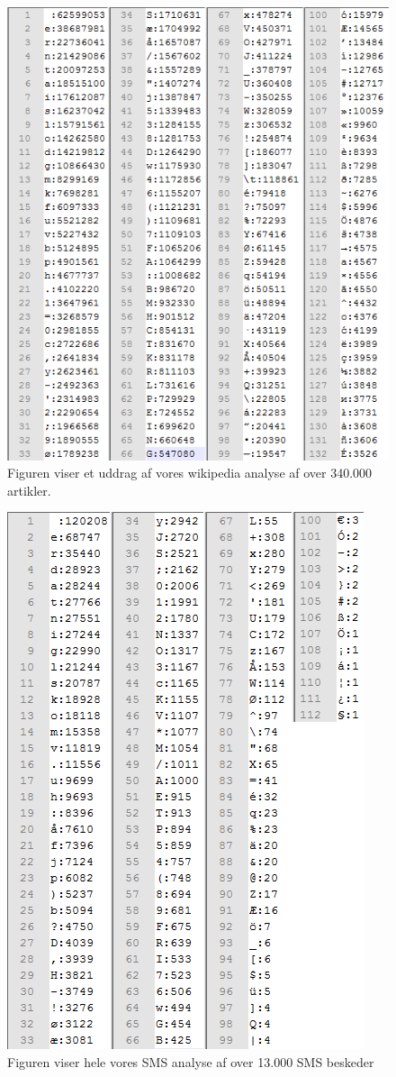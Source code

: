 \begin{figure}[H]
\includegraphics []{Billeder/wikiBilag.png}
\caption {Figuren viser et uddrag af vores wikipedia analyse af over 340.000 artikler.}
\label {wikiAnalyse}
\end{figure}

\begin{figure}[H]
\includegraphics []{Billeder/SMSbilag.png}
\caption {Figuren viser hele vores SMS analyse af over 13.000 SMS beskeder}
\label {SMSanalyse}
\end{figure}

